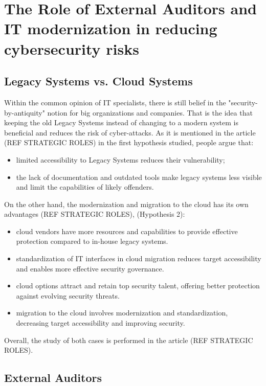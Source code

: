 \documentclass[journal]{IEEEtran}
\begin{document}
\section{The Role of External Auditors and IT modernization in reducing cybersecurity risks}

\subsection{Legacy Systems vs. Cloud Systems}

Within the common opinion of IT specialists, there is still belief in the "security-by-antiquity" notion for big organizations and companies. That is the idea that keeping the old Legacy Systems instead of changing to a modern system is beneficial and reduces the risk of cyber-attacks. As it is mentioned in the article (REF STRATEGIC ROLES) in the first hypothesis studied, people argue that: 

\begin{itemize}
    \item limited accessibility to Legacy Systems reduces their vulnerability;
    \item the lack of documentation and outdated tools make legacy systems less visible and limit the capabilities of likely offenders.
\end{itemize}

On the other hand, the modernization and migration to the cloud has its own advantages (REF STRATEGIC ROLES), (Hypothesis 2):  

\begin{itemize}
    \item cloud vendors have more resources and capabilities to provide effective protection compared to in-house legacy systems.
    \item standardization of IT interfaces in cloud migration reduces target accessibility and enables more effective security governance.
    \item cloud options attract and retain top security talent, offering better protection against evolving security threats.
    \item migration to the cloud involves modernization and standardization, decreasing target accessibility and improving security.
\end{itemize}

Overall, the study of both cases is performed in the article (REF STRATEGIC ROLES). 


\subsection{External Auditors}
\end{document}
